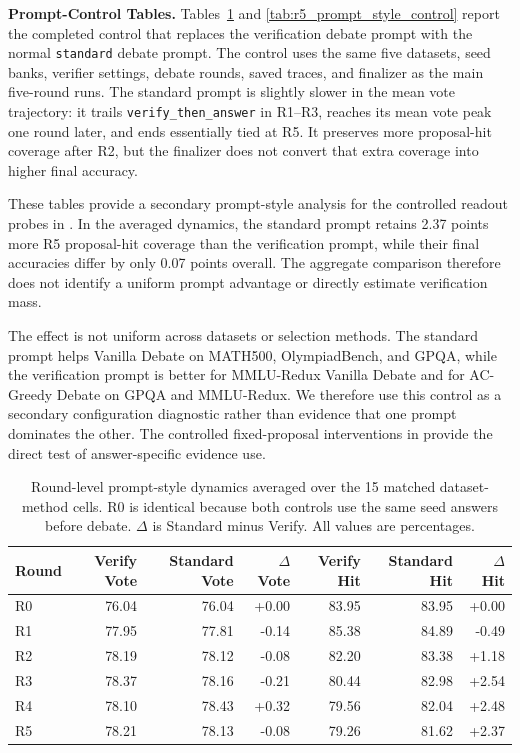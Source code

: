 \clearpage

\textbf{Prompt-Control Tables.}
\label{app:prompt_control_tables}
Tables~\ref{tab:r5_prompt_style_dynamics} and
\ref{tab:r5_prompt_style_control} report the completed control that replaces
the verification debate prompt with the normal \texttt{standard} debate prompt.
The control uses the same five datasets, seed banks, verifier settings, debate
rounds, saved traces, and finalizer as the main five-round runs. The standard
prompt is slightly slower in the mean vote trajectory: it trails
\texttt{verify\_then\_answer} in R1--R3, reaches its mean vote peak one round
later, and ends essentially tied at R5. It preserves more proposal-hit coverage
after R2, but the finalizer does not convert that extra coverage into higher
final accuracy.

These tables provide a secondary prompt-style analysis for the controlled
readout probes in . In the averaged
dynamics, the standard prompt retains 2.37 points more R5 proposal-hit coverage
than the verification prompt, while their final accuracies differ by only 0.07
points overall. The aggregate comparison therefore does not identify a uniform
prompt advantage or directly estimate verification mass.

The effect is not uniform across datasets or selection methods. The standard
prompt helps Vanilla Debate on MATH500, OlympiadBench, and GPQA, while the
verification prompt is better for MMLU-Redux Vanilla Debate and for
AC-Greedy Debate on GPQA and MMLU-Redux. We therefore use this control as a
secondary configuration diagnostic rather than evidence that one prompt
dominates the other. The controlled fixed-proposal interventions in
 provide the direct test of
answer-specific evidence use.

\begin{table}[t]
\centering
\caption{Round-level prompt-style dynamics averaged over the 15 matched
dataset-method cells. R0 is identical because both controls use the same seed
answers before debate. $\Delta$ is Standard minus Verify. All values are
percentages.}
\small
\begin{tabular}{lrrrrrr}
\toprule
Round & Verify Vote & Standard Vote & $\Delta$ Vote & Verify Hit & Standard Hit & $\Delta$ Hit \\
\midrule
R0 & 76.04 & 76.04 & +0.00 & 83.95 & 83.95 & +0.00 \\
R1 & 77.95 & 77.81 & -0.14 & 85.38 & 84.89 & -0.49 \\
R2 & 78.19 & 78.12 & -0.08 & 82.20 & 83.38 & +1.18 \\
R3 & 78.37 & 78.16 & -0.21 & 80.44 & 82.98 & +2.54 \\
R4 & 78.10 & 78.43 & +0.32 & 79.56 & 82.04 & +2.48 \\
R5 & 78.21 & 78.13 & -0.08 & 79.26 & 81.62 & +2.37 \\
\bottomrule
\end{tabular}
\label{tab:r5_prompt_style_dynamics}
\end{table}

